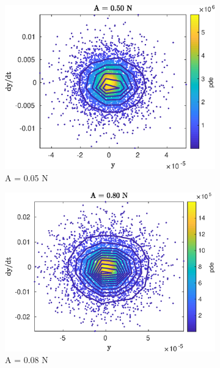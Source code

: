 \documentclass[aspectratio=169]{beamer}
\begin{document}
\begin{frame}[allowframebreaks]
\begin{figure}[!h]
\begin{subfigure}{0.2\linewidth}
      \includegraphics[width=\linewidth]{../../benchmark4/extabs_fig/b4_tdata_kern_famp05}
      \caption{A = 0.05 N}
    \end{subfigure}%
    \begin{subfigure}{0.2\linewidth}
      \includegraphics[width=\linewidth]{../../benchmark4/extabs_fig/b4_tdata_kern_famp08}
      \caption{A = 0.08 N}
    \end{subfigure}%
    \begin{subfigure}{0.2\linewidth}

\end{subfigure}
\end{figure}
\end{frame}
\end{document}
